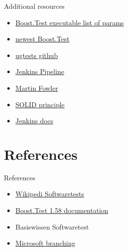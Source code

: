 \documentclass{beamer}
\begin{document}
    \begin{frame}{Additional resources}
            \begin{itemize}
                \item \href{https://www.boost.org/doc/libs/1_58_0/libs/test/doc/html/utf/user-guide/runtime-config/reference.html}{Boost.Test executable list of params}
                \item \href{https://www.boost.org/doc/libs/1_73_0/libs/test/}{newest Boost.Test} %
                \item \href{https://github.com/UG4/plugin_UGTest}{ugtests github}
                \item \href{https://www.jenkins.io/doc/book/pipeline/syntax/}{Jenkins Pipeline}
                \item \href{https://martinfowler.com/articles/practical-test-pyramid.html}{Martin Fowler}
                \item \href{https://en.wikipedia.org/wiki/SOLID}{SOLID principle}
                \item \href{https://www.jenkins.io/doc/}{Jenkins docs}
            \end{itemize}
    \end{frame}

    \section{References}
    \begin{frame}{References}
        \begin{itemize}
            \item \href{https://en.wikipedia.org/wiki/Software_testing}{Wikipedi Softwaretests}
            \item \href{https://www.boost.org/doc/libs/1_58_0/libs/test/}{Boost.Test 1.58 documentation}
            \item Basiswissen Softwaretest%
            \item \href{https://docs.microsoft.com/en-us/azure/devops/repos/git/git-branching-guidance?view=azure-devops}{Microsoft branching}
        \end{itemize}
    \end{frame}
\end{document}
